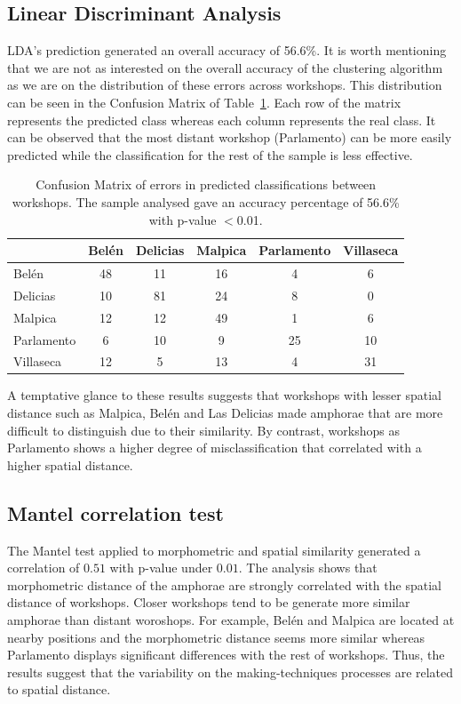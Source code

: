 \documentclass[review]{elsarticle}
\begin{document}
\subsection{Linear Discriminant Analysis}

LDA's prediction generated an overall accuracy of 56.6\%. It is worth mentioning that we are not as interested on the overall accuracy of the clustering algorithm as we are on the distribution of these errors across workshops. This distribution can be seen in the Confusion Matrix of Table~\ref{table:confusion}. Each row of the matrix represents the predicted class whereas each column represents the real class. It can be observed that the most distant workshop (Parlamento) can be more easily predicted while the classification for the rest of the sample is less effective.

\begin{table}[htp]
\begin{tabular}{lccccc}
\hline
      & Belén & Delicias & Malpica & Parlamento & Villaseca\\ \hline
Belén & 48 & 11 & 16 & 4 & 6 \\
Delicias & 10 & 81 & 24 & 8 & 0 \\
Malpica & 12 & 12 & 49 & 1 & 6 \\
Parlamento & 6 & 10 & 9 & 25 & 10 \\
Villaseca & 12 & 5 & 13 & 4 & 31 \\
\hline

\end{tabular}
\caption{Confusion Matrix of errors in predicted classifications between workshops. The sample analysed gave an accuracy percentage of 56.6\% with p-value $<$0.01. }
\label{table:confusion}
\end{table}

A temptative glance to these results suggests that workshops with lesser spatial distance such as Malpica, Belén and Las Delicias made amphorae that are more difficult to distinguish due to their similarity. By contrast, workshops as Parlamento shows a higher degree of misclassification that correlated with a higher spatial distance. 

\subsection{Mantel correlation test}

The Mantel test applied to morphometric and spatial similarity generated a correlation of $0.51$ with p-value under $0.01$. The analysis shows that morphometric distance of the amphorae are strongly correlated with the spatial distance of workshops. Closer workshops tend to be generate more similar amphorae than distant woroshops. For example, Belén and Malpica are located at nearby positions and the morphometric distance seems more similar whereas Parlamento displays significant differences with the rest of workshops. Thus, the results suggest that the variability on the making-techniques processes are related to spatial distance.
\end{document}
